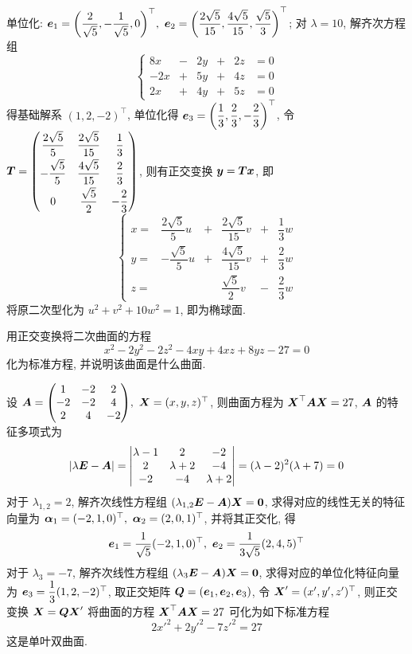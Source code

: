 \begin{solution}
    单位化: $\vb*{e}_1=\qty(\dfrac{2}{\sqrt{5}},-\dfrac{1}{\sqrt{5}},0)^\top,~\vb*{e}_2=\qty(\dfrac{2\sqrt{5}}{15},\dfrac{4\sqrt{5}}{15},\dfrac{\sqrt{5}}{3})^\top$; 对 $\lambda=10$, 解齐次方程组
    $$\left\{\begin{matrix}
            8x  & - & 2y & + & 2z & =0 \\
            -2x & + & 5y & + & 4z & =0 \\
            2x  & + & 4y & + & 5z & =0
        \end{matrix}\right.$$ 得基础解系 $(1,2,-2)^\top$, 单位化得 $\vb*{e}_3=\qty(\dfrac{1}{3},\dfrac{2}{3},-\dfrac{2}{3})^\top$, 令 $\vb*{T}=\begin{pmatrix}
            \dfrac{2\sqrt{5} }{5} & \dfrac{2\sqrt{5}}{15} & \dfrac{1}{3}  \\[6pt]
            -\dfrac{\sqrt5}{5}    & \dfrac{4\sqrt{5}}{15} & \dfrac{2}{3}  \\[6pt]
            0                     & \dfrac{\sqrt5}{2}     & -\dfrac{2}{3}
        \end{pmatrix}$, 则有正交变换 $\vb*{y}=\vb*{Tx}$, 即 $$\left\{\begin{matrix}
            x= & \dfrac{2\sqrt{5} }{5} u & + & \dfrac{2\sqrt{5}}{15}v & + & \dfrac{1}{3}w  \\[6pt]
            y= & -\dfrac{\sqrt5}{5}u     & + & \dfrac{4\sqrt{5}}{15}v & + & \dfrac{2}{3}w  \\[6pt]
            z= &                         &   & \dfrac{\sqrt5}{2}  v   & - & \dfrac{2}{3} w
        \end{matrix}\right.$$ 将原二次型化为 $u^2+v^2+10w^2=1$, 即为椭球面.
\end{solution}

\begin{example}
    用正交变换将二次曲面的方程 $$x^2-2y^2-2z^2-4xy+4xz+8yz-27=0$$ 化为标准方程, 并说明该曲面是什么曲面.
\end{example}
\begin{solution}
    设 $\vb*{A}=\mqty(1&-2&2\\-2&-2&4\\2&4&-2),~\vb*{X}=(x,y,z)^\top$, 则曲面方程为 $\vb*{X}^\top\vb*{AX}=27$, $\vb*{A}$ 的特征多项式为
    $$|\lambda\vb*{E}-\vb*{A}|=\mqty|\lambda-1&2&-2\\2&\lambda+2&-4\\-2&-4&\lambda+2|=(\lambda-2)^2(\lambda+7)=0$$
    对于 $\lambda_{1,2}=2$, 解齐次线性方程组 $(\lambda_{1,2}\vb*{E}-\vb*{A})\vb*{X}=\vb*{0}$, 求得对应的线性无关的特征向量为 $\vb*{\alpha}_1=(-2,1,0)^\top,~\vb*{\alpha}_2=(2,0,1)^\top$, 并将其正交化, 得
    $$\vb*{e}_1=\dfrac{1}{\sqrt{5}}(-2,1,0)^\top,~\vb*{e}_2=\dfrac{1}{3\sqrt{5}}(2,4,5)^\top$$
    对于 $\lambda_3=-7$, 解齐次线性方程组 $(\lambda_3\vb*{E}-\vb*{A})\vb*{X}=\vb*{0}$, 求得对应的单位化特征向量为 $\vb*{e}_3=\dfrac{1}{3}(1,2,-2)^\top$,
    取正交矩阵 $\vb*{Q}=(\vb*{e}_1,\vb*{e}_2,\vb*{e}_3)$, 令 $\vb*{X}'=(x',y',z')^\top$, 则正交变换 $\vb*{X}=\vb*{QX}'$ 将曲面的方程 $\vb*{X}^\top\vb*{AX}=27$ 可化为如下标准方程
    $$2x'^2+2y'^2-7z'^2=27$$ 这是单叶双曲面.
\end{solution}

